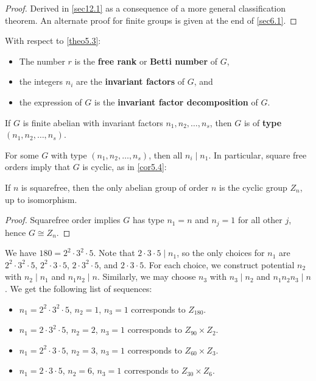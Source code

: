 \begin{proof}
    Derived in \autoref{sec12.1} as a consequence of a more general classification theorem. An alternate proof for finite groups is given at the end of \autoref{sec6.1}.
\end{proof}

 With respect to \autoref{theo5.3}:
\begin{itemize}
    \item The number $r$ is the \textbf{free rank} or \textbf{Betti number} of $G$,
    \item the integers $n_i$ are the \textbf{invariant factors} of $G$, and
    \item the expression of $G$ is the \textbf{invariant factor decomposition} of $G$.
\end{itemize}

 If $G$ is finite abelian with invariant factors $n_1, n_2, \ldots, n_s$, then $G$ is of \textbf{type} $(n_1, n_2, \ldots, n_s)$.

\note For some $G$ with type $(n_1, n_2, \ldots, n_s)$, then all $n_i \mid n_1$. In particular, square free orders imply that $G$ is cyclic, as in \autoref{cor5.4}:

 \label{cor5.4}
If $n$ is squarefree, then the only abelian group of order $n$ is the cyclic group $Z_n$, up to isomorphism.

\begin{proof}
    Squarefree order implies $G$ has type $n_1 = n$ and $n_j = 1$ for all other $j$, hence $G \cong Z_n$.
\end{proof}

\ex We have $180 = 2^2 \cdot 3^2 \cdot 5$. Note that $2 \cdot 3 \cdot 5 \mid n_1$, so the only choices for $n_1$ are $2^2 \cdot 3^2 \cdot 5$, $2^2 \cdot 3 \cdot 5$, $2 \cdot 3^2 \cdot 5$, and $2 \cdot 3 \cdot 5$. For each choice, we construct potential $n_2$ with $n_2 \mid n_1$ and $n_1n_2 \mid n$. Similarly, we may choose $n_3$ with $n_3 \mid n_2$ and $n_1n_2n_3 \mid n$. We get the following list of sequences:
\begin{itemize}
    \item $n_1 = 2^2 \cdot 3^2 \cdot 5$, $n_2 = 1$, $n_3 = 1$ corresponds to $Z_{180}$.
    \item $n_1 = 2 \cdot 3^2 \cdot 5$, $n_2 = 2$, $n_3 = 1$ corresponds to $Z_{90} \times Z_2$.
    \item $n_1 = 2^2 \cdot 3 \cdot 5$, $n_2 = 3$, $n_3 = 1$ corresponds to $Z_{60} \times Z_3$.
    \item $n_1 = 2 \cdot 3 \cdot 5$, $n_2 = 6$, $n_3 = 1$ corresponds to $Z_{30} \times Z_6$.
\end{itemize}

